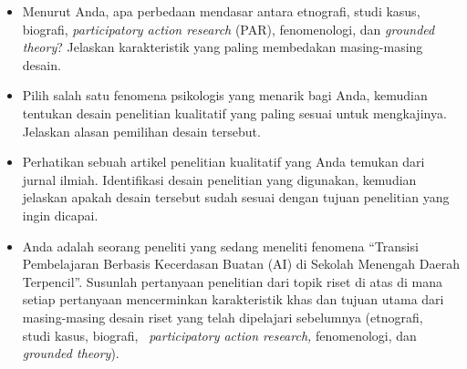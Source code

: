 \documentclass[
  indonesian,
  letterpaper,
  DIV=11,
  numbers=noendperiod]{scrreprt}
\providecommand{\tightlist}{%
  \setlength{\itemsep}{0pt}\setlength{\parskip}{0pt}}
\begin{document}
\begin{tcolorbox}[enhanced jigsaw, colframe=quarto-callout-important-color-frame, toptitle=1mm, breakable, leftrule=.75mm, arc=.35mm, toprule=.15mm, colback=white, colbacktitle=quarto-callout-important-color!10!white, bottomtitle=1mm, bottomrule=.15mm, titlerule=0mm, title=\textcolor{quarto-callout-important-color}{\faExclamation}\hspace{0.5em}{Refleksi \& Diskusi}, coltitle=black, left=2mm, opacitybacktitle=0.6, opacityback=0, rightrule=.15mm]

\begin{itemize}
\tightlist
\item
  Menurut Anda, apa perbedaan mendasar antara etnografi, studi kasus,
  biografi, \emph{participatory action research} (PAR), fenomenologi,
  dan \emph{grounded theory}? Jelaskan karakteristik yang paling
  membedakan masing-masing desain.
\item
  Pilih salah satu fenomena psikologis yang menarik bagi Anda, kemudian
  tentukan desain penelitian kualitatif yang paling sesuai untuk
  mengkajinya. Jelaskan alasan pemilihan desain tersebut.
\item
  Perhatikan sebuah artikel penelitian kualitatif yang Anda temukan dari
  jurnal ilmiah. Identifikasi desain penelitian yang digunakan, kemudian
  jelaskan apakah desain tersebut sudah sesuai dengan tujuan penelitian
  yang ingin dicapai.
\item
  Anda adalah seorang peneliti yang sedang meneliti fenomena ``Transisi
  Pembelajaran Berbasis Kecerdasan Buatan (AI) di Sekolah Menengah
  Daerah Terpencil''. Susunlah pertanyaan penelitian dari topik riset di
  atas di mana setiap pertanyaan mencerminkan karakteristik khas dan
  tujuan utama dari masing-masing desain riset yang telah dipelajari
  sebelumnya (etnografi,~ studi kasus, biografi,~ \emph{participatory
  action research,} fenomenologi, dan \emph{grounded theory}).
\end{itemize}

\end{tcolorbox}
\end{document}
